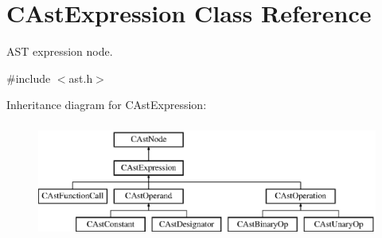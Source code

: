 \hypertarget{classCAstExpression}{\section{C\-Ast\-Expression Class Reference}
\label{classCAstExpression}
}


A\-S\-T expression node.  




{\ttfamily \#include $<$ast.\-h$>$}

Inheritance diagram for C\-Ast\-Expression\-:\begin{figure}[H]
\begin{center}
\leavevmode
\includegraphics[height=3.796610cm]{classCAstExpression}
\end{center}
\end{figure}
